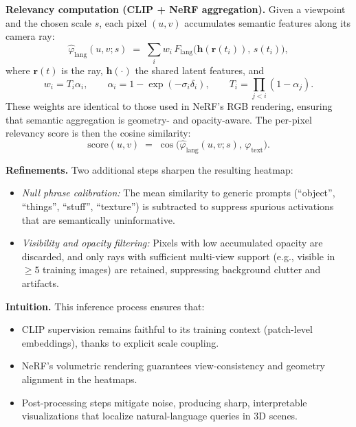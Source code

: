 \begin{enrichment}
\begin{enrichment}
        \medskip
        \noindent
        \textbf{Relevancy computation (CLIP + NeRF aggregation).}
        Given a viewpoint and the chosen scale \(s\), each pixel \((u,v)\) accumulates semantic features along its camera ray:
        \[
        \hat{\varphi}_{\text{lang}}(u,v;s) \;=\; \sum_i w_i\,F_{\text{lang}}\!\big(\mathbf{h}(\mathbf{r}(t_i)),\, s(t_i)\big),
        \]
        where \(\mathbf{r}(t)\) is the ray, \(\mathbf{h}(\cdot)\) the shared latent features, and
        \[
        w_i = T_i \alpha_i, \qquad 
        \alpha_i = 1-\exp(-\sigma_i\delta_i), \qquad
        T_i = \prod_{j<i}(1-\alpha_j).
        \]
        These weights are identical to those used in NeRF’s RGB rendering, ensuring that semantic aggregation is geometry- and opacity-aware. The per-pixel relevancy score is then the cosine similarity:
        \[
        \text{score}(u,v) \;=\; \cos\!\big(\hat{\varphi}_{\text{lang}}(u,v;s), \,\varphi_{\text{text}}\big).
        \]
        
        \medskip
        \noindent
        \textbf{Refinements.}
        Two additional steps sharpen the resulting heatmap:
        \begin{itemize}
            \item \emph{Null phrase calibration:} The mean similarity to generic prompts (``object'', ``things'', ``stuff'', ``texture'') is subtracted to suppress spurious activations that are semantically uninformative.
            \item \emph{Visibility and opacity filtering:} Pixels with low accumulated opacity are discarded, and only rays with sufficient multi-view support (e.g., visible in \(\geq 5\) training images) are retained, suppressing background clutter and artifacts.
        \end{itemize}
        
        \medskip
        \noindent
        \textbf{Intuition.}
        This inference process ensures that:
        \begin{itemize}
            \item CLIP supervision remains faithful to its training context (patch-level embeddings), thanks to explicit scale coupling.
            \item NeRF’s volumetric rendering guarantees view-consistency and geometry alignment in the heatmaps.
            \item Post-processing steps mitigate noise, producing sharp, interpretable visualizations that localize natural-language queries in 3D scenes.
        \end{itemize}
        

\end{enrichment}
\end{enrichment}
